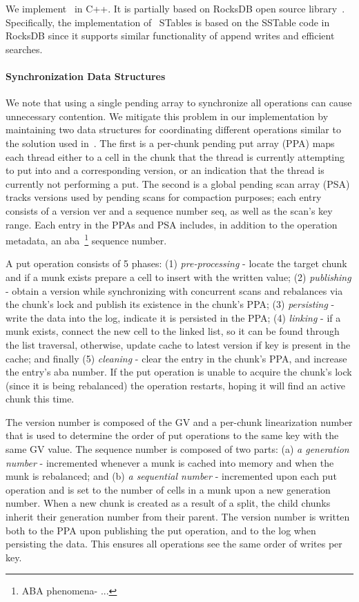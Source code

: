 We implement \sys\ in C++. It is partially based on RocksDB open source library~\cite{RocksDB}.
Specifically, the implementation of \sys\ STables is based on the SSTable code in RocksDB since it supports similar functionality of append writes and efficient searches. 

\paragraph{Synchronization Data Structures}
We note that using a single pending array to synchronize all
operations can cause unnecessary contention.
We mitigate this problem in our implementation by maintaining two data structures for coordinating different operations similar to the solution used in~\cite{kiwi}. The first is a per-chunk pending put array (PPA) maps each thread either to a cell in the chunk that the thread is currently attempting to put into and a corresponding version, or an indication that the thread is currently not performing a put. The second is a global pending scan array (PSA) tracks versions used by pending scans for compaction purposes; each entry consists of a version ver and a sequence number seq, as well as the scan’s key range. Each entry in the PPAs and PSA includes, in addition to the operation metadata, an aba~\footnote{ABA phenomena- ...} sequence number. 

A put operation consists of 5 phases: (1) \emph{pre-processing} - locate the target chunk and if a munk exists prepare a cell to insert with the written value; (2) \emph{publishing} - obtain a version while synchronizing with concurrent scans and rebalances via the chunk's lock and publish its existence in the chunk's PPA; (3) \emph{persisting} - write the data into the log, indicate it is persisted in the PPA; (4) \emph{linking} - if a munk exists, connect the new cell to the linked list, so it can be found through the list traversal, otherwise, update cache to latest version if key is present in the cache; and finally (5) \emph{cleaning} - clear the entry in the chunk's PPA, and increase the entry's aba number.
If the put operation is unable to acquire the chunk's lock (since it is being rebalanced) the operation restarts, hoping it will find an active chunk this time.

The version number is composed of the GV and a per-chunk linearization number that is used to determine the order of put operations to the same key with the same GV value.  The sequence number is composed of two parts: (a) \emph{a generation number} - incremented whenever a munk is cached into memory and when the munk is rebalanced; and (b) \emph{a sequential number} - incremented upon each put operation and is set to the number of cells in a munk upon a new generation number. When a new chunk is created as a result of a split, the child chunks inherit their generation number from their parent. The version number is written both to the PPA upon publishing the put operation, and to the log when persisting the data. This ensures all operations see the same order of writes per key.

